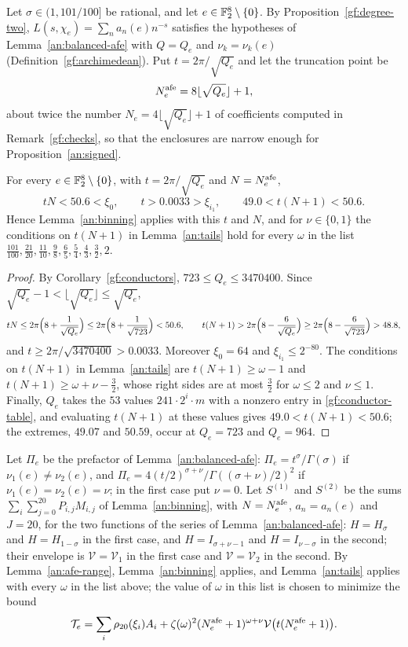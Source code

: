 Let $\sigma\in(1,101/100]$ be rational, and let $e\in\mathbb F_2^8\setminus\{0\}$.
By Proposition~\ref{gf:degree-two}, $L(s,\chi_e)=\sum_na_n(e)n^{-s}$
satisfies the hypotheses of Lemma~\ref{an:balanced-afe} with $Q=Q_e$ and
$\nu_k=\nu_k(e)$ (Definition~\ref{gf:archimedean}). Put $t=2\pi/\sqrt{Q_e}$ and let the truncation point be
\[
 N^{\rm afe}_e=8\lfloor\sqrt{Q_e}\rfloor+1,
\]
about twice the number $N_e=4\lfloor\sqrt{Q_e}\rfloor+1$ of coefficients
computed in Remark~\ref{gf:checks},
so that the enclosures are narrow enough for Proposition~\ref{an:signed}.

\begin{lemma}\label{an:afe-range}
For every $e\in\mathbb F_2^8\setminus\{0\}$, with $t=2\pi/\sqrt{Q_e}$ and
$N=N^{\rm afe}_e$,
\[
 tN<50.6<\xi_0,\qquad t>0.0033>\xi_{i_1},\qquad 49.0<t(N+1)<50.6.
\]
Hence Lemma~\ref{an:binning} applies with this $t$ and $N$, and for
$\nu\in\{0,1\}$ the conditions on $t(N+1)$ in Lemma~\ref{an:tails} hold for every
$\omega$ in the list
$\frac{101}{100},\frac{21}{20},\frac{11}{10},\frac98,\frac65,\frac54,
\frac43,\frac32,2$.
\end{lemma}

\begin{proof}
By Corollary~\ref{gf:conductors}, $723\le Q_e\le3470400$. Since
$\sqrt{Q_e}-1<\lfloor\sqrt{Q_e}\rfloor\le\sqrt{Q_e}$,
\[
 tN\le2\pi\Bigl(8+\frac1{\sqrt{Q_e}}\Bigr)\le2\pi\Bigl(8+\frac1{\sqrt{723}}\Bigr)
 <50.6,\qquad
 t(N+1)>2\pi\Bigl(8-\frac6{\sqrt{Q_e}}\Bigr)\ge2\pi\Bigl(8-\frac6{\sqrt{723}}\Bigr)
 >48.8,
\]
and $t\ge2\pi/\sqrt{3470400}>0.0033$. Moreover $\xi_0=64$ and
$\xi_{i_1}\le2^{-80}$. The conditions on $t(N+1)$ in Lemma~\ref{an:tails} are
$t(N+1)\ge\omega-1$ and $t(N+1)\ge\omega+\nu-\frac32$, whose right sides are
at most $\frac32$ for $\omega\le2$ and $\nu\le1$. Finally, $Q_e$ takes the
$53$ values $241\cdot2^i\cdot m$ with a nonzero entry in
\eqref{gf:conductor-table}, and evaluating $t(N+1)$ at these values gives
$49.0<t(N+1)<50.6$; the extremes, $49.07$ and $50.59$, occur at
$Q_e=723$ and $Q_e=964$.
\end{proof}

Let $\Pi_e$ be the prefactor of Lemma~\ref{an:balanced-afe}:
$\Pi_e=t^\sigma/\Gamma(\sigma)$ if $\nu_1(e)\ne\nu_2(e)$, and
$\Pi_e=4(t/2)^{\sigma+\nu}/\Gamma((\sigma+\nu)/2)^2$ if
$\nu_1(e)=\nu_2(e)=\nu$; in the first case put $\nu=0$. Let $S^{(1)}$ and
$S^{(2)}$ be the sums $\sum_i\sum_{j=0}^{20}P_{i,j}M_{i,j}$ of
Lemma~\ref{an:binning}, with $N=N^{\rm afe}_e$, $a_n=a_n(e)$ and $J=20$, for
the two functions of the series of Lemma~\ref{an:balanced-afe}: $H=H_\sigma$
and $H=H_{1-\sigma}$ in the first case, and $H=I_{\sigma+\nu-1}$ and
$H=I_{\nu-\sigma}$ in the second; their envelope is $\mathcal V=\mathcal V_1$
in the first case and $\mathcal V=\mathcal V_2$ in the second. By
Lemma~\ref{an:afe-range}, Lemma~\ref{an:binning} applies, and
Lemma~\ref{an:tails} applies with every $\omega$ in the list above; the value
of $\omega$ in this list is chosen to minimize the bound
\[
 \mathcal T_e=\sum_i\rho_{20}(\xi_i)A_i
 +\zeta(\omega)^2(N^{\rm afe}_e+1)^{\omega+\nu}
 \mathcal V\bigl(t(N^{\rm afe}_e+1)\bigr).
\]

